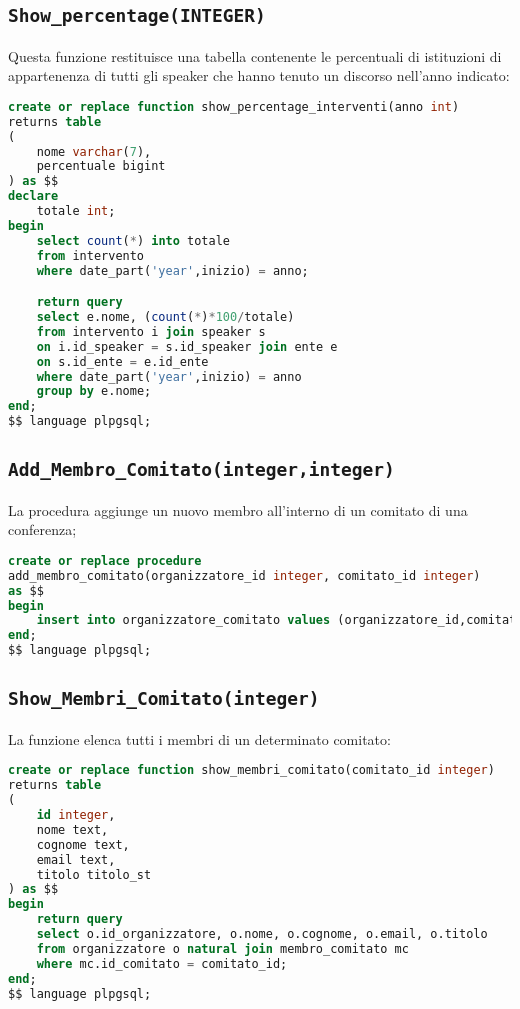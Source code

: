 \subsection{\texttt{Show\_percentage(INTEGER)}}
Questa funzione restituisce una tabella contenente le percentuali di istituzioni di appartenenza di tutti gli speaker che hanno tenuto un discorso nell'anno indicato:
\begin{lstlisting}[language=SQL,style=mystyle]
create or replace function show_percentage_interventi(anno int)
returns table
(
    nome varchar(7),
    percentuale bigint
) as $$
declare
    totale int;
begin
    select count(*) into totale
    from intervento
    where date_part('year',inizio) = anno;

    return query
    select e.nome, (count(*)*100/totale)
    from intervento i join speaker s 
    on i.id_speaker = s.id_speaker join ente e 
    on s.id_ente = e.id_ente
    where date_part('year',inizio) = anno
    group by e.nome;
end;
$$ language plpgsql;
\end{lstlisting}
\subsection{\texttt{Add\_Membro\_Comitato(integer,integer)}}
La procedura aggiunge un nuovo membro all'interno di un comitato di una conferenza;
\begin{lstlisting}[language=SQL,style=mystyle]
create or replace procedure 
add_membro_comitato(organizzatore_id integer, comitato_id integer)
as $$
begin
    insert into organizzatore_comitato values (organizzatore_id,comitato_id);
end;
$$ language plpgsql;
\end{lstlisting}
\subsection{\texttt{Show\_Membri\_Comitato(integer)}}
La funzione elenca tutti i membri di un determinato comitato:
\begin{lstlisting}[language=SQL,style=mystyle]
create or replace function show_membri_comitato(comitato_id integer)
returns table
(
    id integer,
    nome text,
    cognome text,
    email text,
    titolo titolo_st
) as $$
begin
    return query
    select o.id_organizzatore, o.nome, o.cognome, o.email, o.titolo
    from organizzatore o natural join membro_comitato mc
    where mc.id_comitato = comitato_id;
end;
$$ language plpgsql;
\end{lstlisting}
